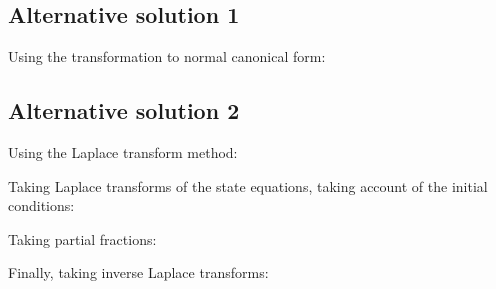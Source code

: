  

\subsection*{Alternative solution 1}
Using the transformation to normal canonical form:

 
 
 

 
 

 
\subsection*{Alternative solution 2} 
Using the Laplace transform method:

Taking Laplace transforms of the state equations, taking account of the initial conditions:

 

 
 

 
 

Taking partial fractions:

 

Finally, taking inverse Laplace transforms:

 




\endinput

